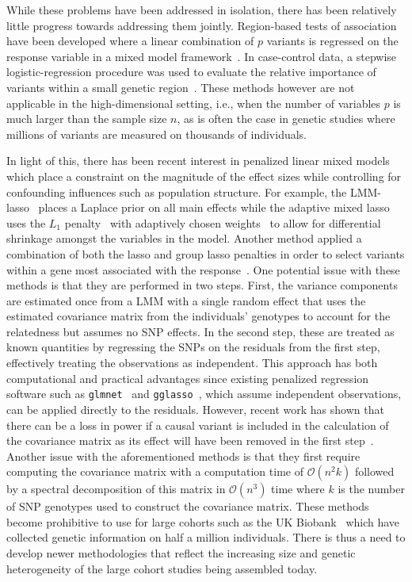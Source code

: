 \documentclass[12pt,letter]{article}\usepackage[]{graphicx}\usepackage[]{color}
\begin{document}
While these problems have been addressed in isolation, there has been relatively little progress towards addressing them jointly. 
Region-based tests of association have been developed where a linear combination of $p$ variants is regressed on the response variable in a mixed model framework~\citep{oualkacha2013adjusted}. 
In case-control data, a stepwise logistic-regression procedure was used to evaluate the relative importance of variants within a small genetic region~\citep{cordell2002unified}. 
These methods however are not applicable in the high-dimensional setting, i.e., when the number of variables $p$ is much larger than the sample size $n$, as is often the case in genetic studies where millions of variants are measured on thousands of individuals.
 
In light of this, there has been recent interest in penalized linear mixed models which  place a constraint on the magnitude of the effect sizes while controlling for confounding influences such as population structure. 
For example, the LMM-lasso~\citep{rakitsch2013lasso} places a Laplace prior on all main effects while the adaptive mixed lasso~\citep{wang2011identifying} uses the $L_1$ penalty~\citep{tibshirani1996regression} with adaptively chosen weights~\citep{zou2006adaptive} to allow for differential shrinkage amongst the variables in the model. 
Another method applied a combination of both the lasso and group lasso penalties in order to select variants within a gene most associated with the response~\citep{ding20142}. 
One potential issue with these methods is that they are performed in two steps. First, the variance components are estimated once from a LMM with a single random effect that uses the estimated covariance matrix from the individuals' genotypes to account for the relatedness but assumes no SNP effects. 
In the second step, these are treated as known quantities by regressing the SNPs on the residuals from the first step, effectively treating the observations as independent.
This approach has both computational and practical advantages since existing penalized regression software such as \texttt{glmnet}~\citep{friedman2010regularization} and \texttt{gglasso}~\citep{yang2015fast}, which assume independent observations, can be applied directly to the residuals. 
However, recent work has shown that there can be a loss in power if a causal variant is included in the calculation of the covariance matrix as its effect will have been removed in the first step~\citep{oualkacha2013adjusted,yang2014advantages}. 
Another issue with the aforementioned methods is that they first require computing the covariance matrix with a computation time of $\mathcal{O}(n^2k)$ followed by a spectral decomposition of this matrix in $\mathcal{O}(n^3)$ time where $k$ is the number of SNP genotypes used to construct the covariance matrix. These methods become prohibitive to use for large cohorts such as the UK Biobank~\citep{allen2012uk} which have collected genetic information on half a million individuals. 
There is thus a need to develop newer methodologies that reflect the increasing size and genetic heterogeneity of the large cohort studies being assembled today.  
\end{document}
